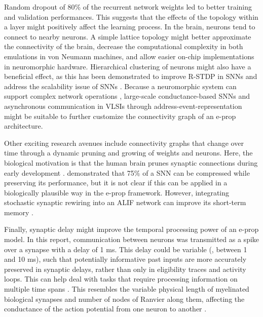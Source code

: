     Random dropout of 80\% of the recurrent network weights led to better training and validation performances.
    This suggests that the effects of the topology within a layer might positively affect the learning process.
    In the brain, neurons tend to connect to nearby neurons.
    A simple lattice topology might better approximate the connectivity of the brain, decrease the computational complexity in both emulations in von Neumann machines, and allow easier on-chip implementations in neuromorphic hardware.
    Hierarchical clustering of neurons might also have a beneficial effect, as this has been demonstrated to improve R-STDP in SNNs \citep{weidel2021unsupervised} and address the scalability issue of SNNs \citep{carrillo2012scalable}.
    Because a neuromorphic system can support complex network operations \citep{hasler1990vlsi}, large-scale conductance-based SNNs \citep{yang2019scalable,Yang2019RealTimeNS} and asynchronous communication in VLSIs through address-event-representation \citep{lazzaro1993silicon,deiss1999pulse} might be suitable to further customize the connectivity graph of an e-prop architecture.

    Other exciting research avenues include connectivity graphs that change over time through a dynamic pruning and growing of weights and neurons.
    Here, the biological motivation is that the human brain prunes synaptic connections during early development \citep{huttenlocher1979synaptic}.
    \citet{elbez2020progressive} demonstrated that 75\% of a SNN can be compressed while preserving its performance, but it is not clear if this can be applied in a biologically plausible way in the e-prop framework.
    However, integrating stochastic synaptic rewiring \citep{kappel2018dynamic} into an ALIF network can improve its short-term memory \citep{bellec2020solution}.

    Finally, synaptic delay might improve the temporal processing power of an e-prop model.
    In this report, communication between neurons was transmitted as a spike over a synapse with a delay of 1 ms.
    This delay could be variable (\eg, between 1 and 10 ms), such that potentially informative past inputs are more accurately preserved in synaptic delays, rather than only in eligibility traces and activity loops.
    This can help deal with tasks that require processing information on multiple time spans \citep{jaeger2021dimensions}.
    This resembles the variable physical length of myelinated biological synapses and number of nodes of Ranvier along them, affecting the conductance of the action potential from one neuron to another \citep{bean2007action}.


